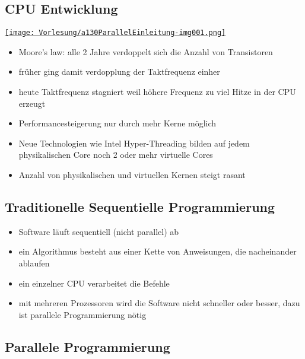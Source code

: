 \subsection{CPU Entwicklung}
\begin{center}
\href{https://www.karlrupp.net/2015/06/40-years-of-microprocessor-trend-data/}{ 
\texttt{[image: Vorlesung/a130ParallelEinleitung-img001.png]} }
\end{center}

\begin{itemize}
\item Moore's law: alle 2 Jahre verdoppelt sich die Anzahl von Transistoren
\item früher ging damit verdopplung der Taktfrequenz einher
\item heute Taktfrequenz stagniert weil höhere Frequenz zu viel Hitze in der CPU erzeugt
\item Performancesteigerung nur durch mehr Kerne möglich
\item Neue Technologien wie Intel Hyper-Threading bilden auf jedem physikalischen Core noch 2 oder mehr virtuelle Cores
\item Anzahl von physikalischen und virtuellen Kernen steigt rasant
\end{itemize}

\subsection{Traditionelle Sequentielle Programmierung}

\begin{itemize}
\item Software läuft sequentiell (nicht parallel) ab
\item ein Algorithmus besteht aus einer Kette von Anweisungen, die nacheinander ablaufen
\item ein einzelner CPU verarbeitet die Befehle
\item mit mehreren Prozessoren wird die Software nicht schneller oder besser, dazu ist parallele Programmierung nötig
\end{itemize}

\subsection{Parallele Programmierung}

